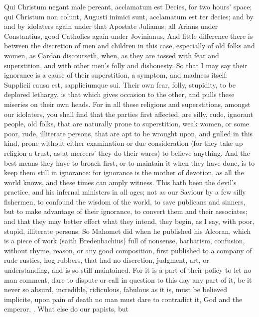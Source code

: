 {Qui Christum negant male pereant, acclamatum est Decies, for two
hours' space; qui Christum non colunt, Augusti inimici sunt, acclamatum
est ter decies; and by and by idolaters again under that Apostate
Julianus; all Arians under Constantius, good Catholics again under
Jovinianus, And little difference there is between the discretion of
men and children in this case, especially of old folks and women, as
 Cardan discourseth, when, as they are tossed with fear and
superstition, and with other men's folly and dishonesty. So that I may
say their ignorance is a cause of their superstition, a symptom, and
madness itself: Supplicii causa est, sappliciumque sui. Their own fear,
folly, stupidity, to be deplored lethargy, is that which gives occasion
to the other, and pulls these miseries on their own heads. For in all
these religions and superstitions, amongst our idolaters, you shall
find that the parties first affected, are silly, rude, ignorant people,
old folks, that are naturally prone to superstition, weak women, or
some poor, rude, illiterate persons, that are apt to be wrought upon,
and gulled in this kind, prone without either examination or due
consideration (for they take up religion a trust, as at mercers' they
do their wares) to believe anything. And the best means they have to
broach first, or to maintain it when they have done, is to keep them
still in ignorance: for ignorance is the mother of devotion, as all the
world knows, and these times can amply witness. This hath been the
devil's practice, and his infernal ministers in all ages; not as our
Saviour by a few silly fishermen, to confound the wisdom of the world,
to save publicans and sinners, but to make advantage of their
ignorance, to convert them and their associates; and that they may
better effect what they intend, they begin, as I say, with poor,
stupid, illiterate persons. So Mahomet did when he published his
Alcoran, which is a piece of work (saith Bredenbachius) full of
nonsense, barbarism, confusion, without rhyme, reason, or any good
composition, first published to a company of rude rustics, hog-rubbers,
that had no discretion, judgment, art, or understanding, and is so
still maintained. For it is a part of their policy to let no man
comment, dare to dispute or call in question to this day any part of
it, be it never so absurd, incredible, ridiculous, fabulous as it is,
must be believed implicite, upon pain of death no man must dare to
contradict it, God and the emperor, \etc{}. What else do our papists, but
}
